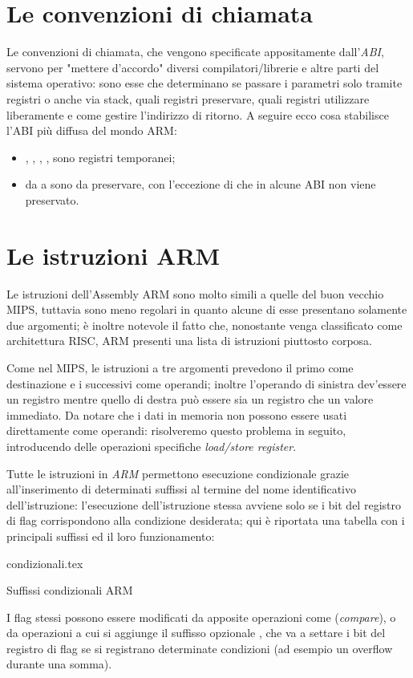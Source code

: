\documentclass[class=book, crop=false, oneside]{standalone}
\begin{document}
\section{Le convenzioni di chiamata}
Le convenzioni di chiamata, che vengono specificate appositamente dall'\emph{ABI}, servono per "mettere d'accordo" diversi compilatori/librerie e altre parti del sistema operativo: sono esse che determinano se passare i parametri solo tramite registri o anche via stack, quali registri preservare, quali registri utilizzare liberamente e come gestire l'indirizzo di ritorno. A seguire ecco cosa stabilisce l'ABI più diffusa del mondo ARM:
\begin{itemize}
	\item {}, , , ,  sono registri temporanei;
	\item da  a  sono da preservare, con l'eccezione di  che in alcune ABI non viene preservato.
\end{itemize}

\section{Le istruzioni ARM}
Le istruzioni dell'Assembly ARM sono molto simili a quelle del buon vecchio MIPS, tuttavia sono meno regolari in quanto alcune di esse presentano solamente due argomenti; è inoltre notevole il fatto che, nonostante venga classificato come architettura RISC, ARM presenti una lista di istruzioni piuttosto corposa.

Come nel MIPS, le istruzioni a tre argomenti prevedono il primo come destinazione e i successivi come operandi; inoltre l'operando di sinistra dev'essere un registro mentre quello di destra può essere sia un registro che un valore immediato. Da notare che i dati in memoria non possono essere usati direttamente come operandi: risolveremo questo problema in seguito, introducendo delle operazioni specifiche \emph{load/store register}.

Tutte le istruzioni in \emph{ARM} permettono esecuzione condizionale grazie all'inserimento di determinati suffissi al termine del nome identificativo dell'istruzione: l'esecuzione dell'istruzione stessa avviene solo se i bit del registro di flag corrispondono alla condizione desiderata; qui è riportata una tabella con i principali suffissi ed il loro funzionamento:

\vspace{0.4cm}
\begin{table}[H]
	\centering
	{condizionali.tex}
	\caption{Suffissi condizionali ARM}
\end{table}
I flag stessi possono essere modificati da apposite operazioni come  (\emph{compare}), o da operazioni a cui si aggiunge il suffisso opzionale , che va a settare i bit del registro di flag se si registrano determinate condizioni (ad esempio un overflow durante una somma).
\end{document}
